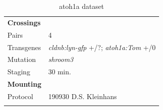 \documentclass[11pt,singlespacinge,twoside]{reedthesis} %
\begin{document}
\begin{longtable}[]{@{}ll@{}}
\caption{\label{tab:atoset} atoh1a dataset}\tabularnewline
\toprule
\endhead
\begin{minipage}[t]{0.21\columnwidth}\raggedright
\textbf{Crossings}\strut
\end{minipage} & \begin{minipage}[t]{0.73\columnwidth}\raggedright
\strut
\end{minipage}\tabularnewline
\begin{minipage}[t]{0.21\columnwidth}\raggedright
Pairs\strut
\end{minipage} & \begin{minipage}[t]{0.73\columnwidth}\raggedright
4\strut
\end{minipage}\tabularnewline
\begin{minipage}[t]{0.21\columnwidth}\raggedright
Transgenes\strut
\end{minipage} & \begin{minipage}[t]{0.73\columnwidth}\raggedright
\emph{cldnb:lyn-gfp} +/?; \emph{atoh1a:Tom} +/0\strut
\end{minipage}\tabularnewline
\begin{minipage}[t]{0.21\columnwidth}\raggedright
Mutation\strut
\end{minipage} & \begin{minipage}[t]{0.73\columnwidth}\raggedright
\emph{shroom3}\strut
\end{minipage}\tabularnewline
\begin{minipage}[t]{0.21\columnwidth}\raggedright
Staging\strut
\end{minipage} & \begin{minipage}[t]{0.73\columnwidth}\raggedright
30 min.\strut
\end{minipage}\tabularnewline
\begin{minipage}[t]{0.21\columnwidth}\raggedright
\textbf{Mounting}\strut
\end{minipage} & \begin{minipage}[t]{0.73\columnwidth}\raggedright
\strut
\end{minipage}\tabularnewline
\begin{minipage}[t]{0.21\columnwidth}\raggedright
Protocol\strut
\end{minipage} & \begin{minipage}[t]{0.73\columnwidth}\raggedright
190930 D.S. Kleinhans\strut
\end{minipage}\tabularnewline
\begin{minipage}[t]{0.21\columnwidth}\raggedright

\end{minipage}
\end{longtable}
\end{document}
